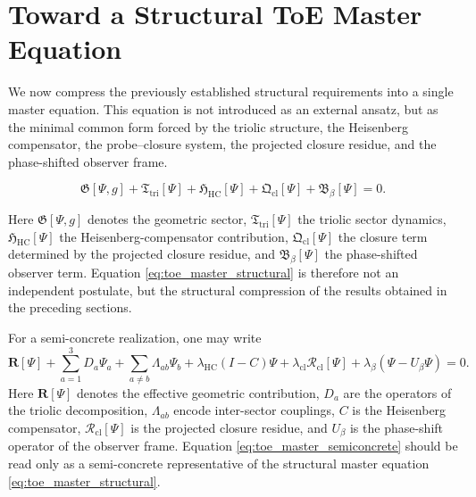 \section{Toward a Structural ToE Master Equation}
\label{sec:toe-master}

We now compress the previously established structural requirements into a
single master equation. This equation is not introduced as an external ansatz,
but as the minimal common form forced by the triolic structure, the
Heisenberg compensator, the probe--closure system, the projected closure
residue, and the phase-shifted observer frame.

\begin{equation}\label{eq:toe_master_structural}
\mathfrak G[\Psi,g]
+\mathfrak T_{\mathrm{tri}}[\Psi]
+\mathfrak H_{\mathrm{HC}}[\Psi]
+\mathfrak Q_{\mathrm{cl}}[\Psi]
+\mathfrak B_{\beta}[\Psi]
=0 .
\end{equation}

Here $\mathfrak G[\Psi,g]$ denotes the geometric sector,
$\mathfrak T_{\mathrm{tri}}[\Psi]$ the triolic sector dynamics,
$\mathfrak H_{\mathrm{HC}}[\Psi]$ the Heisenberg-compensator contribution,
$\mathfrak Q_{\mathrm{cl}}[\Psi]$ the closure term determined by the projected
closure residue, and $\mathfrak B_{\beta}[\Psi]$ the phase-shifted observer
term. Equation \eqref{eq:toe_master_structural} is therefore not an
independent postulate, but the structural compression of the results obtained
in the preceding sections.

For a semi-concrete realization, one may write
\begin{equation}\label{eq:toe_master_semiconcrete}
\mathbf{R}[\Psi]
+\sum_{a=1}^{3} D_a\Psi_a
+\sum_{a\neq b}\Lambda_{ab}\Psi_b
+\lambda_{\mathrm{HC}}(I-C)\Psi
+\lambda_{\mathrm{cl}}\mathcal R_{\mathrm{cl}}[\Psi]
+\lambda_{\beta}(\Psi-U_{\beta}\Psi)
=0 .
\end{equation}
Here $\mathbf{R}[\Psi]$ denotes the effective geometric contribution,
$D_a$ are the operators of the triolic decomposition,
$\Lambda_{ab}$ encode inter-sector couplings,
$C$ is the Heisenberg compensator,
$\mathcal R_{\mathrm{cl}}[\Psi]$ is the projected closure residue,
and $U_{\beta}$ is the phase-shift operator of the observer frame.
Equation \eqref{eq:toe_master_semiconcrete} should be read only as a
semi-concrete representative of the structural master equation
\eqref{eq:toe_master_structural}.

